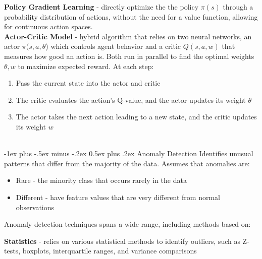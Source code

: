 \documentclass[10pt,landscape]{article}
\makeatletter
\renewcommand{\section}{\@startsection{section}{1}{0mm}%
                                {-1ex plus -.5ex minus -.2ex}%
                                {0.5ex plus .2ex}%
                                {\normalfont\large\bfseries}}
\makeatother
\begin{document}
\begin{multicols}{3}
\textbf{Policy Gradient Learning} - directly optimize the the policy $\pi(s)$ through a probability distribution of actions, without the need for a value function, allowing for continuous action spaces.  \\
\smallskip
\textbf{Actor-Critic Model} - hybrid algorithm that relies on two neural networks, an actor $\pi(s,a,\theta$) which controls agent behavior  and a critic $Q(s,a,w)$ that measures how good an action is. Both run in parallel to find the optimal weights $\theta, w$ to maximize expected reward. At each step:
\begin{enumerate}[leftmargin=5mm]
\itemsep -.4mm
\item Pass the current state into the actor and critic
\item The critic evaluates the action's Q-value, and the actor updates its weight $\theta$
\item The actor takes the next action leading to a new state, and the critic updates its weight $w$
\end{enumerate}
\columnbreak

\textcolor{white}{.}\vspace{-4mm}\\ %
\section{Anomaly Detection}
Identifies unusual patterns that differ from the majority of the data. Assumes that anomalies are:
\begin{itemize}[label={--},leftmargin=4mm]
\itemsep -.4mm
\item Rare - the minority class that occurs rarely in the data
\item Different - have feature values that are very different from normal observations
\end{itemize}
Anomaly detection techniques spans a wide range, including methods based on:

\textbf{Statistics} - relies on various statistical methods to identify outliers, such as Z-tests, boxplots, interquartile ranges, and variance comparisons


\end{multicols}
\end{document}
